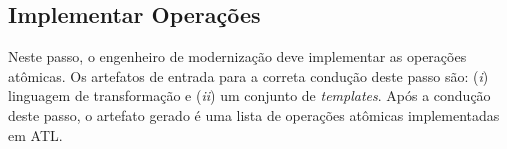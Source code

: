 \subsection{Implementar Operações}\label{sec:linguagemDeTransformacaoUtilizada}




Neste passo, o engenheiro de modernização deve implementar as operações atômicas. Os artefatos de entrada para a correta condução deste passo são: (\textit{i}) linguagem de transformação e (\textit{ii}) um conjunto de \textit{templates}. Após a condução deste passo, o artefato gerado é uma lista de operações atômicas implementadas em ATL. 

